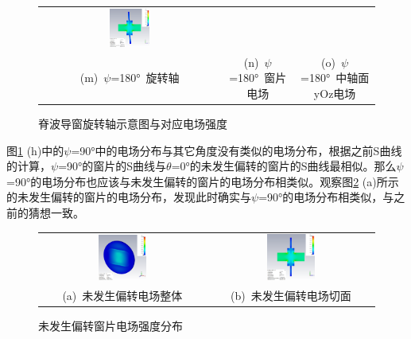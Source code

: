 \documentclass[master]{thesis-uestc}
\begin{document}
\begin{figure}[!htb]
\begin{tabular}{@{\ }c@{\ }c@{\ }c}
        \hspace{5pt}
        \includegraphics[width=0.23\textwidth]{pic/chapter5/X180电场切面.png}   \\
        \mbox{\small (m) \(\psi\)=180° 旋转轴}                                                                               & 
        \mbox{\small (n) \(\psi\)=180° 窗片电场}  & 
        \mbox{\small (o) \(\psi\)=180° 中轴面yOz电场}                                                                                 \\[6bp]
    \end{tabular}
    \caption{脊波导窗旋转轴示意图与对应电场强度}
    \label{fig:X旋转轴与窗片电场}
\end{figure}

图\ref{fig:X旋转轴与窗片电场} (h)中的\(\psi\)=90°中的电场分布与其它角度没有类似的电场分布，根据之前S曲线的计算，\(\psi\)=90°的窗片的S曲线与\(\theta\)=0°的未发生偏转的窗片的S曲线最相似。那么\(\psi\)=90°的电场分布也应该与未发生偏转的窗片的电场分布相类似。观察图\ref{fig:X未发生偏转} (a)所示的未发生偏转的窗片的电场分布，发现此时确实与\(\psi\)=90°的电场分布相类似，与之前的猜想一致。
\begin{figure}[!htb]
    \small
    \centering
    \begin{tabular}{@{\ }c@{\ }c}
        \includegraphics[width=0.3\textwidth]{pic/chapter5/X未旋转电场整体.png} &
        \hspace{5pt}
        \includegraphics[width=0.3\textwidth]{pic/chapter5/X未旋转电场切面.png}     \\
        \mbox{\small (a) 未发生偏转电场整体}                                                                               &
        \mbox{\small (b) 未发生偏转电场切面}                                                                                  \\
    \end{tabular}
    \caption{未发生偏转窗片电场强度分布}
    \label{fig:X未发生偏转}
\end{figure}
\end{document}
